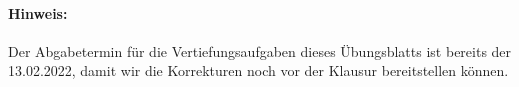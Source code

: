 \paragraph{Hinweis:} Der Abgabetermin für die Vertiefungsaufgaben dieses Übungsblatts
ist bereits der 13.02.2022,
damit wir die Korrekturen noch vor der Klausur bereitstellen können.

